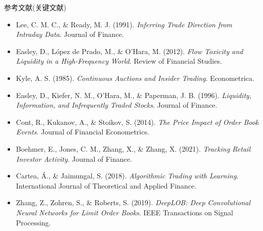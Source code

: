 \documentclass[10pt,aspectratio=169]{beamer}
\begin{document}
\begin{frame}{参考文献(关键文献)}
  \footnotesize
  \begin{itemize}
    \item Lee, C. M. C., \& Ready, M. J. (1991). \emph{Inferring Trade Direction from Intraday Data}. Journal of Finance.
    \item Easley, D., López de Prado, M., \& O'Hara, M. (2012). \emph{Flow Toxicity and Liquidity in a High-Frequency World}. Review of Financial Studies.
    \item Kyle, A. S. (1985). \emph{Continuous Auctions and Insider Trading}. Econometrica.
    \item Easley, D., Kiefer, N. M., O'Hara, M., \& Paperman, J. B. (1996). \emph{Liquidity, Information, and Infrequently Traded Stocks}. Journal of Finance.
    \item Cont, R., Kukanov, A., \& Stoikov, S. (2014). \emph{The Price Impact of Order Book Events}. Journal of Financial Econometrics.
    \item Boehmer, E., Jones, C. M., Zhang, X., \& Zhang, X. (2021). \emph{Tracking Retail Investor Activity}. Journal of Finance.
    \item Cartea, Á., \& Jaimungal, S. (2018). \emph{Algorithmic Trading with Learning}. International Journal of Theoretical and Applied Finance.
    \item Zhang, Z., Zohren, S., \& Roberts, S. (2019). \emph{DeepLOB: Deep Convolutional Neural Networks for Limit Order Books}. IEEE Transactions on Signal Processing.
  \end{itemize}
\end{frame}
\end{document}
